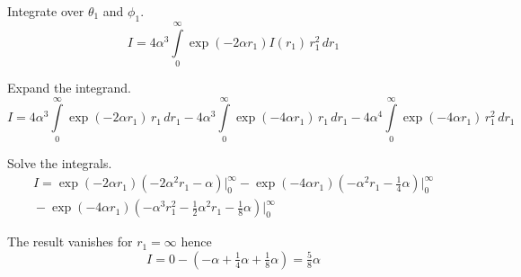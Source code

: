 \documentclass[12pt]{article}
\begin{document}
Integrate over $\theta_1$ and $\phi_1$.
\begin{equation*}
I=4\alpha^3\int\limits_0^\infty
\exp(-2\alpha r_1)I(r_1)\,r_1^2\,dr_1
\end{equation*}

Expand the integrand.
\begin{equation*}
I=4\alpha^3\int\limits_0^\infty\exp(-2\alpha r_1)\,r_1\,dr_1
-4\alpha^3\int\limits_0^\infty\exp(-4\alpha r_1)\,r_1\,dr_1
-4\alpha^4\int\limits_0^\infty\exp(-4\alpha r_1)\,r_1^2\,dr_1
\end{equation*}

Solve the integrals.
\begin{multline*}
I=\exp(-2\alpha r_1)\left(-2\alpha^2r_1-\alpha\right)\bigg|_0^\infty
-\exp(-4\alpha r_1)\left(-\alpha^2r_1-\tfrac{1}{4}\alpha\right)\bigg|_0^\infty
\\
{}-\exp(-4\alpha r_1)\left(-\alpha^3r_1^2-\tfrac{1}{2}\alpha^2r_1-\tfrac{1}{8}\alpha\right)\bigg|_0^\infty
\end{multline*}

The result vanishes for $r_1=\infty$ hence
\begin{equation*}
I=0-\left(-\alpha+\tfrac{1}{4}\alpha+\tfrac{1}{8}\alpha\right)=\tfrac{5}{8}\alpha
\tag{7}
\end{equation*}
\end{document}
